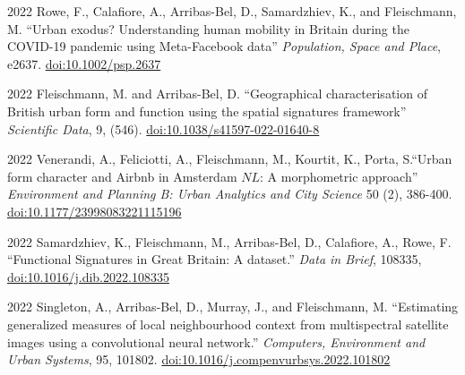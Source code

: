 \documentclass[11pt,a4paper]{report}
\begin{document}
\begin{tablist}
        \item[2022] \tab{}Rowe, F., Calafiore, A., Arribas-Bel, D., Samardzhiev, K., and Fleischmann, M. \enquote{Urban exodus? Understanding human mobility in Britain during the COVID-19 pandemic using Meta-Facebook data} \textit{Population, Space and Place}, e2637. \href{https://doi.org/10.1002/psp.2637}{doi:10.1002/psp.2637}


        \item[2022] \tab{}Fleischmann, M. and Arribas-Bel, D. \enquote{Geographical characterisation of British urban form and function using the spatial signatures framework} \textit{Scientific Data}, 9, (546). \href{https://doi.org/10.1038/s41597-022-01640-8}{doi:10.1038/s41597-022-01640-8}

        \item[2022] \tab{}Venerandi, A., Feliciotti, A., Fleischmann, M., Kourtit, K., Porta, S.\enquote{Urban form character and Airbnb in Amsterdam \(NL\): A morphometric approach} \textit{Environment and Planning B: Urban Analytics and City Science} 50 (2), 386-400. \href{https://doi.org/10.1177/23998083221115196}{doi:10.1177/23998083221115196}

        \item[2022] \tab{}Samardzhiev, K., Fleischmann, M., Arribas-Bel, D., Calafiore, A., Rowe, F. \enquote{Functional Signatures in Great Britain: A dataset.} \textit{Data in Brief}, 108335, \href{https://doi.org/10.1016/j.dib.2022.108335}{doi:10.1016/j.dib.2022.108335}

        \item[2022] \tab{}Singleton, A., Arribas-Bel, D., Murray, J., and Fleischmann, M. \enquote{Estimating generalized measures of local neighbourhood context from multispectral satellite images using a convolutional neural network.} \textit{Computers, Environment and Urban Systems}, 95, 101802. \href{https://doi.org/10.1016/j.compenvurbsys.2022.101802}{doi:10.1016/j.compenvurbsys.2022.101802}



\end{tablist}
\end{document}
